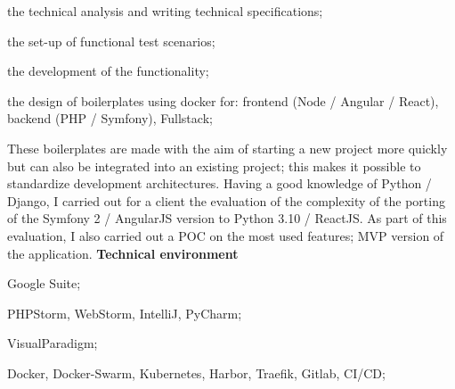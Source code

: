 \begin{cventries}
{      \begin{cvitems}
        \item {the technical analysis and writing technical specifications;}
        \item {the set-up of functional test scenarios;}
        \item {the development of the functionality;}
        \item {the design of boilerplates using docker for: frontend (Node / Angular / React), backend (PHP / Symfony), Fullstack;}
      \end{cvitems}
      These boilerplates are made with the aim of starting a new project more 
      quickly but can also be integrated into an existing project; this makes 
      it possible to standardize development architectures.
      \newline
      Having a good knowledge of Python / Django, I carried out for a client 
      the evaluation of the complexity of the porting of the Symfony 2 / AngularJS 
      version to Python 3.10 / ReactJS. As part of this evaluation, I also 
      carried out a POC on the most used features; MVP version of the application.
      \newline \vspace{2pt}
      \textbf{Technical environment}
      \newline \vspace{12pt}
      \begin{cvitems}
        \item {Google Suite;}
        \item {PHPStorm, WebStorm, IntelliJ, PyCharm;}
        \item {VisualParadigm;}
        \item {Docker, Docker-Swarm, Kubernetes, Harbor, Traefik, Gitlab, CI/CD;}
      \end{cvitems}
    }


\end{cventries}
